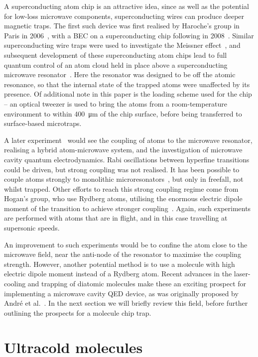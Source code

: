 A superconducting atom chip is an attractive idea, since as well as the
potential for low-loss microwave components, superconducting wires can produce
deeper magnetic traps. The first such device was first realised by
Haroche's group in Paris in 2006~\cite{Nirrengarten2006}, with a BEC on a
superconducting chip following in 2008~\cite{Roux2008}. Similar superconducting
wire traps were used to investigate the Meissner
effect~\cite{PhysRevLett.101.183006}, and subsequent development of these
superconducting atom chips lead to full quantum control of an atom cloud held
in place above a superconducting microwave resonator~\cite{Bernon2013}. Here
the resonator was designed to be off the atomic resonance, so that the internal
state of the trapped atoms were unaffected by its presence. Of additional note
in this paper is the loading scheme used for the chip -- an optical tweezer is
used to bring the atoms from a room-temperature environment to within
\SI{400}{\micro\meter} of the chip surface, before being transferred to
surface-based microtraps.

A later experiment~\cite{Hattermann2017} would see the coupling of atoms to the
microwave resonator, realising a hybrid atom-microwave system, and the
investigation of microwave cavity quantum electrodynamics. Rabi oscillations
between hyperfine transitions could be driven, but strong coupling was not
realised. It has been possible to couple atoms strongly to monolithic
microresonators~\cite{Aoki2006}, but only in freefall, not whilst trapped.
Other efforts to reach this strong coupling regime come from Hogan's group, who
use Rydberg atoms, utilising the enormous electric dipole moment of the
transition to achieve stronger coupling~\cite{PhysRevLett.124.193604}. Again,
such experiments are performed with atoms that are in flight, and in this case
travelling at supersonic speeds.

An improvement to such experiments would be to confine the atom close to the
microwave field, near the anti-node of the resonator to maximise the coupling
strength. However, another potential method is to use a molecule with high
electric dipole moment instead of a Rydberg atom. Recent advances in the
laser-cooling and trapping of diatomic molecules make these an exciting
prospect for implementing a microwave cavity QED device, as was originally
proposed by Andr\'e et al.~\cite{Andre2006}. In the next section we will
briefly review this field, before further outlining the prospects for a
molecule chip trap.

\section{Ultracold molecules}

